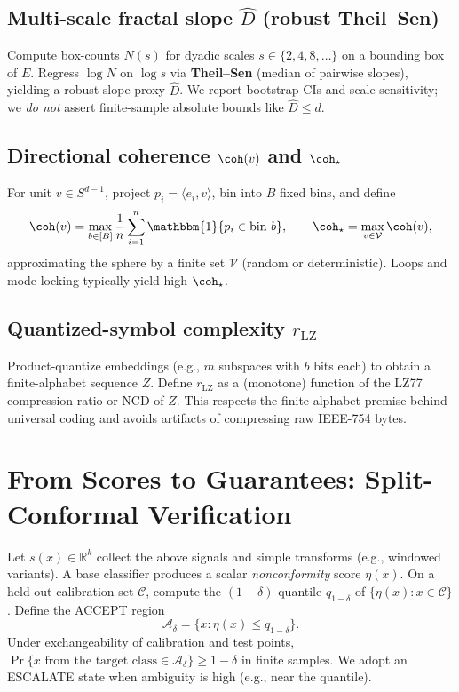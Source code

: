 \documentclass[11pt]{article}
\begin{document}
\subsection{Multi-scale fractal slope $\hat D$ (robust Theil--Sen)}
Compute box-counts $N(s)$ for dyadic scales $s\in\{2,4,8,\dots\}$ on a bounding box of $E$. Regress $\log N$ on $\log s$ via \textbf{Theil--Sen} (median of pairwise slopes), yielding a robust slope proxy $\hat D$. We report bootstrap CIs and scale-sensitivity; we \emph{do not} assert finite-sample absolute bounds like $\hat D\le d$.

\subsection{Directional coherence $\coh(v)$ and $\coh_\star$}
For unit $v\in S^{d-1}$, project $p_i=\langle e_i,v\rangle$, bin into $B$ fixed bins, and define
\[
  \coh(v)=\max_{b\in[B]} \frac{1}{n}\sum_{i=1}^n \mathbbm{1}\{p_i\in \text{bin }b\},\qquad
  \coh_\star = \max_{v\in\mathcal{V}} \coh(v),
\]
approximating the sphere by a finite set $\mathcal{V}$ (random or deterministic). Loops and mode-locking typically yield high $\coh_\star$.

\subsection{Quantized-symbol complexity $r_{\mathrm{LZ}}$}
Product-quantize embeddings (e.g., $m$ subspaces with $b$ bits each) to obtain a finite-alphabet sequence $Z$. Define $r_{\mathrm{LZ}}$ as a (monotone) function of the LZ77 compression ratio or NCD of $Z$. This respects the finite-alphabet premise behind universal coding and avoids artifacts of compressing raw IEEE-754 bytes.

\section{From Scores to Guarantees: Split-Conformal Verification}
Let $s(x)\in\mathbb{R}^k$ collect the above signals and simple transforms (e.g., windowed variants). A base classifier produces a scalar \emph{nonconformity} score $\eta(x)$. On a held-out calibration set $\mathcal{C}$, compute the $(1-\delta)$ quantile $q_{1-\delta}$ of $\{\eta(x):x\in\mathcal{C}\}$. Define the \textsc{ACCEPT} region
\[
\mathcal{A}_\delta=\{x:\eta(x)\le q_{1-\delta}\}.
\]
Under exchangeability of calibration and test points, $\Pr\{x\text{ from the target class}\in\mathcal{A}_\delta\}\ge 1-\delta$ in finite samples. We adopt an \textsc{ESCALATE} state when ambiguity is high (e.g., near the quantile).
\end{document}

